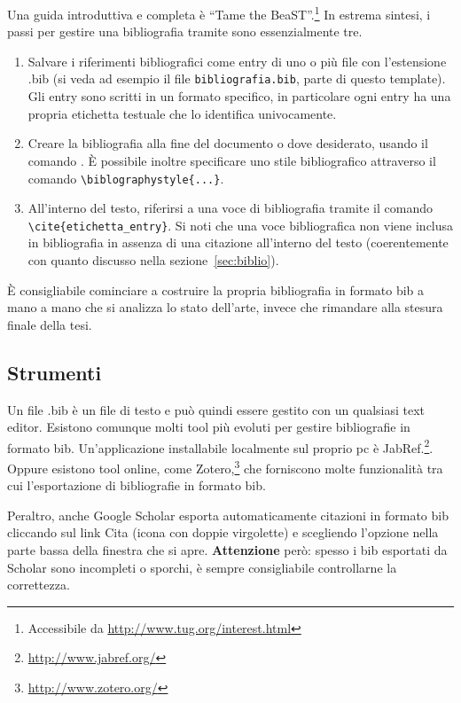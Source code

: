 \documentclass[12pt,italian]{report}
\begin{document}
Una guida introduttiva e completa \`e ``Tame the BeaST''.\footnote{Accessibile da \url{http://www.tug.org/interest.html}} 
In estrema sintesi, i passi per gestire una bibliografia tramite  sono essenzialmente tre.
\begin{enumerate}
\item Salvare i riferimenti bibliografici come entry di uno o pi\`u file con l'estensione .bib (si veda ad esempio il file \texttt{bibliografia.bib}, parte di questo template). Gli entry sono scritti in un formato specifico, in particolare ogni entry ha una propria etichetta testuale che lo identifica univocamente.
\item Creare la bibliografia alla fine del documento o dove desiderato, usando il comando \verb||. \`E possibile inoltre specificare uno stile bibliografico attraverso il comando \verb|\biblographystyle{...}|.
\item All'interno del testo, riferirsi a una voce di bibliografia tramite il comando \verb|\cite{etichetta_entry}|. Si noti che una voce bibliografica non viene inclusa in bibliografia in assenza di una citazione all'interno del testo (coerentemente con quanto discusso nella sezione~\ref{sec:biblio}).
\end{enumerate}

\`E consigliabile cominciare a costruire la propria bibliografia in formato bib a mano a mano che si analizza lo stato dell'arte, invece che rimandare alla stesura finale della tesi.

\subsection{Strumenti}

Un file .bib \`e un file di testo e pu\`o quindi essere gestito con un qualsiasi text editor. Esistono comunque molti tool pi\`u evoluti per gestire bibliografie in formato bib. Un'applicazione installabile localmente sul proprio pc \`e JabRef.\footnote{\url{http://www.jabref.org/}}. Oppure esistono tool online, come Zotero,\footnote{\url{http://www.zotero.org/}} che forniscono molte funzionalità tra cui l'esportazione di bibliografie in formato bib.

Peraltro, anche Google Scholar esporta automaticamente citazioni in formato bib cliccando sul link Cita (icona con doppie virgolette) e scegliendo l'opzione  nella parte bassa della finestra che si apre. \textbf{Attenzione} per\`o: spesso i bib esportati da Scholar sono incompleti o sporchi, \`e sempre consigliabile controllarne la correttezza.
\end{document}
